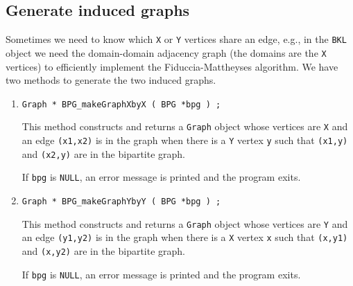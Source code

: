 \subsection{Generate induced graphs}
\label{subsection:BPG:proto:induced-graphs}
\par
Sometimes we need to know which {\tt X} or {\tt Y} vertices 
share an edge,
e.g., in the {\tt BKL} object we need the domain-domain adjacency
graph (the domains are the {\tt X} vertices)
to efficiently implement the Fiduccia-Mattheyses algorithm.
We have two methods to generate the two induced graphs.
\par
\begin{enumerate}
\item
\begin{verbatim}
Graph * BPG_makeGraphXbyX ( BPG *bpg ) ;
\end{verbatim}
This method constructs and returns a {\tt Graph} object whose
vertices are {\tt X} and an edge {\tt (x1,x2)} is in the graph
when there is a {\tt Y} vertex {\tt y} such that {\tt (x1,y)}
and {\tt (x2,y)} are in the bipartite graph.
\par {}
If {\tt bpg} is {\tt NULL},
an error message is printed and the program exits.
\item
\begin{verbatim}
Graph * BPG_makeGraphYbyY ( BPG *bpg ) ;
\end{verbatim}
This method constructs and returns a {\tt Graph} object whose
vertices are {\tt Y} and an edge {\tt (y1,y2)} is in the graph
when there is a {\tt X} vertex {\tt x} such that {\tt (x,y1)}
and {\tt (x,y2)} are in the bipartite graph.
\par {}
If {\tt bpg} is {\tt NULL},
an error message is printed and the program exits.
\end{enumerate}
\par
